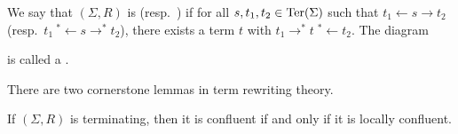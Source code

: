 We say that $(\Sigma,R)$ is  (resp.\ ) if for all $s,t_1,t_2 \in \operatorname{Ter}(\Sigma)$ such that $t_1 \leftarrow s \to t_2$ (resp.\ $t_1 \:{}^*\!\!\leftarrow s \to^* t_2$), there exists a term $t$ with $t_1 \to^* t\; {}^*\!\!\leftarrow t_2$.  
The diagram  
\begin{center}
\end{center}
is called a .

There are two cornerstone lemmas in term rewriting theory.

\begin{lemma}
  \label{thm:Newman}
  If $(\Sigma,R)$ is terminating, then it is confluent if and only if it is locally confluent.
\end{lemma}

